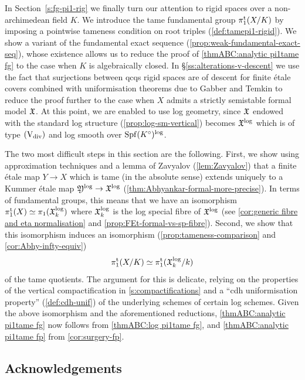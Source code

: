 In Section~\ref{s:fg-pi1-rig} we finally turn our attention to rigid spaces over a non-archimedean field $K$. We introduce the tame fundamental group $\pi_1^{\mathrm{t}}(X/K)$ by imposing a pointwise tameness condition on root triples (\cref{def:tamepi1-rigid}). We show a variant of the fundamental exact sequence (\cref{prop:weak-fundamental-exact-seq}), whose existence allows us to reduce the proof of \cref{thmABC:analytic pi1tame fg} to the case when $K$ is algebraically closed. 
In \S\ref{ss:alterations-v-descent} we use the fact that surjections between qcqs rigid spaces are of descent for finite \'etale covers combined with  uniformisation theorems due to Gabber \cite{TravauxGabberIX} and Temkin \cite{Temkin2017:AlteredLocalUniformization} to reduce the proof further to the case when $X$ admits a strictly semistable formal model ${\mathfrak{X}}$. At this point, we are enabled to use log geometry, since ${\mathfrak{X}}$ endowed with the standard log structure (\cref{prop:log-sm-vertical}) becomes ${\mathfrak{X}}^{\log}$ which is of type $(\mathrm{V}_{\rm div})$ and log smooth over $\operatorname{Spf}(K^\circ)^{\log}$.

The two most difficult steps in this
  section are the following. First, we show using approximation techniques and a lemma of Zavyalov (\cref{lem:Zavyalov}) that a finite \'etale map $Y\to X$ which is tame (in the absolute sense) extends uniquely to a Kummer \'etale map ${\mathfrak{Y}}^{\log} \to {\mathfrak{X}}^{\log}$ (\cref{thm:Abhyankar-formal-more-precise}). In terms of fundamental groups, this means that we have an isomorphism $\pi_1^{\mathrm{t}}(X) \simeq \pi_1({\mathfrak{X}}^{\log}_k)$ where ${\mathfrak{X}}^{\log}_k$ is the log special fibre of ${\mathfrak{X}}^{\log}$ (see \cref{cor:generic fibre and eta normalisation} and \cref{prop:FEt-formal-vs-sp-fibre}). 
  Second, we show that this isomorphism induces an isomorphism (\cref{prop:tameness-comparison} and \cref{cor:Abhy-infty-equiv})
\[
    \pi_1^{\mathrm{t}}(X/K) \simeq \pi_1^{\mathrm{t}}({\mathfrak{X}}^{\log}_k/k)
\]
of the tame quotients.
The argument for this is delicate, relying on the properties of the vertical compactification in \cref{s:compactifications} and a ``cdh uniformisation property'' (\cref{def:cdh-unif}) of the underlying schemes of certain log schemes. Given the above isomorphism and the aforementioned reductions, \cref{thmABC:analytic pi1tame fg} now follows from \cref{thmABC:log pi1tame fg}, and \cref{thmABC:analytic pi1tame fp} from \cref{cor:surgery-fp}. 


\subsection*{Acknowledgements}

